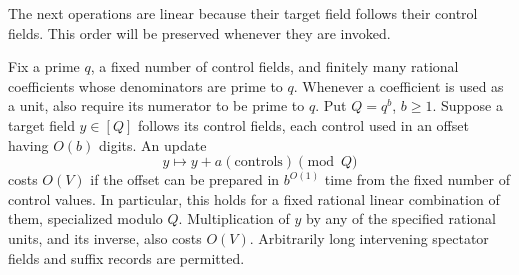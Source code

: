 The next operations are linear because their target field follows their
control fields.  This order will be preserved whenever they are invoked.

\begin{lemma}
\label{lem:ordered-affine-streams}
Fix a prime $q$, a fixed number of control fields, and finitely many
rational coefficients whose denominators are prime to $q$.  Whenever a
coefficient is used as a unit, also require its numerator to be prime to
$q$.  Put $Q=q^b$, $b\ge1$.
Suppose a target field $y\in[Q]$ follows its control fields, each control
used in an offset having $O(b)$ digits.  An update
\[
 y\longmapsto y+a(\text{controls})\pmod Q
\]
costs $O(V)$ if the offset can be prepared in $b^{O(1)}$ time from the
fixed number of control values.  In particular, this holds for a fixed
rational linear combination of them, specialized modulo $Q$.
Multiplication of $y$ by any of the specified rational units, and its
inverse, also costs $O(V)$.  Arbitrarily long intervening spectator
fields and suffix records are permitted.
\end{lemma}

